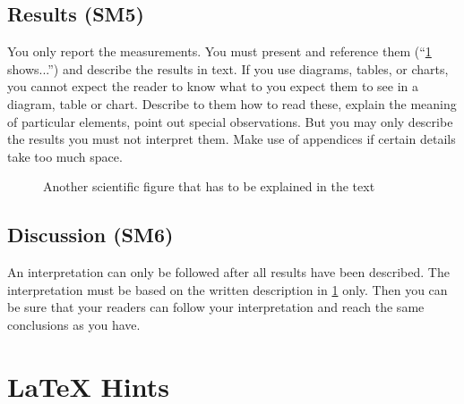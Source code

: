 \documentclass[
  fontsize=10pt
  numbers=noenddot,
  english,  %
  paper=a5,
  twoside,  %
  DIV=calc,
  headings=small,
  bibliography=totoc,
  listof=totoc,
  draft=false
]{scrbook}
\theoremstyle{break}
\begin{document}
\section{Results (SM5)}\label{sec:evaluation:results}

You only report the measurements. You must present and reference them (``\cref{fig:my_label2} shows...'') and describe the results in text. If you use diagrams, tables, or charts, you cannot expect the reader to know what to you expect them to see in a diagram, table or chart. Describe to them how to read these, explain the meaning of particular elements, point out special observations. But you may only describe the results you must not interpret them. Make use of appendices if certain details take too much space.

\begin{figure}
    \centering
    \caption{Another scientific figure that has to be explained in the text}
    \label{fig:my_label2}
\end{figure}

\section{Discussion (SM6)}\label{sec:evaluation:discussion}

An interpretation can only be followed after all results have been described. The interpretation must be based on the written description in \cref{sec:evaluation:results} only. Then you can be sure that your readers can follow your interpretation and reach the same conclusions as you have.


\chapter{LaTeX Hints}
\label{sec:latexhints}

\newcount\LTGbeginlineexample
\newcount\LTGendlineexample
\newenvironment{ltgexample}%
{\LTGbeginlineexample=\numexpr\inputlineno+1\relax}%
{\LTGendlineexample=\numexpr\inputlineno-1\relax%
%
\tcbinputlisting{%
  listing only,
  listing file=\currfilepath,
  colback=green!5!white,
  colframe=green!25,
  coltitle=black!90,
  coltext=black!90,
  left=8mm,
  title=Corresponding \LaTeX{} code of \texttt{\currfilepath},
  listing options={%
    frame=none,
    language={[LaTeX]TeX},
    escapeinside={},
    firstline=\the\LTGbeginlineexample,
    lastline=\the\LTGendlineexample,
    firstnumber=\the\LTGbeginlineexample,
    basewidth=.5em,
    aboveskip=0mm,
    belowskip=0mm,
    numbers=left,
    xleftmargin=0mm,
    numberstyle=\tiny,
    numbersep=8pt%
  }
}
}%
\end{document}
